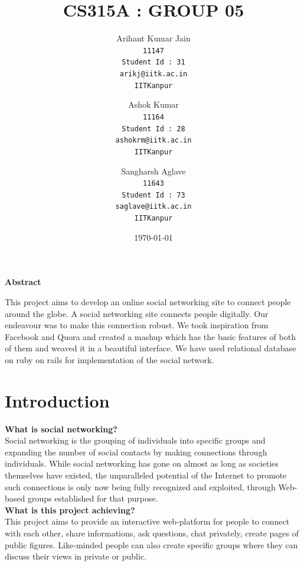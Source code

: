 \documentclass{article}
\newcommand{\subtitle}[1]{%
  \posttitle{%
    \par\end{center}
    \begin{center}\large#1\end{center}
    \vskip0.5em}%
}
\begin{document}
\title{CS315A : GROUP 05}
\subtitle{\textbf{ONLINE SOCIAL NETWORKING}}
\author{
  Arihant Kumar Jain\\
  \texttt{11147}\\  
  \texttt{Student Id : 31}\\
  \texttt{arikj@iitk.ac.in}\\
  \texttt{IITKanpur}
  \and
  Ashok Kumar\\
  \texttt{11164}\\
  \texttt{Student Id : 28}\\
  \texttt{ashokrm@iitk.ac.in}\\
  \texttt{IITKanpur}
  \and
  Sangharsh Aglave\\
  \texttt{11643}\\
  \texttt{Student Id : 73}\\
  \texttt{saglave@iitk.ac.in}\\
  \texttt{IITKanpur}
} 
\date{\today}
\newcommand{\sus}[2]{$#1_{#2}$}
\maketitle
\newpage
\newpage

\centerline{\textbf{Abstract}}
This project aims to develop an online social networking site to connect people around the globe. A social networking site connects people digitally. Our endeavour was to make this connection robust. We took inspiration from Facebook and Quora and created a mashup which has the basic features of both of them and weaved it in a beautiful interface. We have used relational database on ruby on rails for implementation of the social network.   

\section{Introduction}
\textbf{What is social networking?}\\
Social networking is the grouping of individuals into specific groups and expanding the number of social contacts by making connections through individuals. While social networking has gone on almost as long as societies themselves have existed, the unparalleled potential of the Internet to promote such connections is only now being fully recognized and exploited, through Web-based groups established for that purpose.\\

\textbf{What is this project achieving?}\\
This project aims to provide an interactive web-platform for people to connect with each other, share informations, ask questions, chat privately, create pages of public figures. Like-minded people can also create specific groups where they can discuss their views in private or public.
\end{document}
